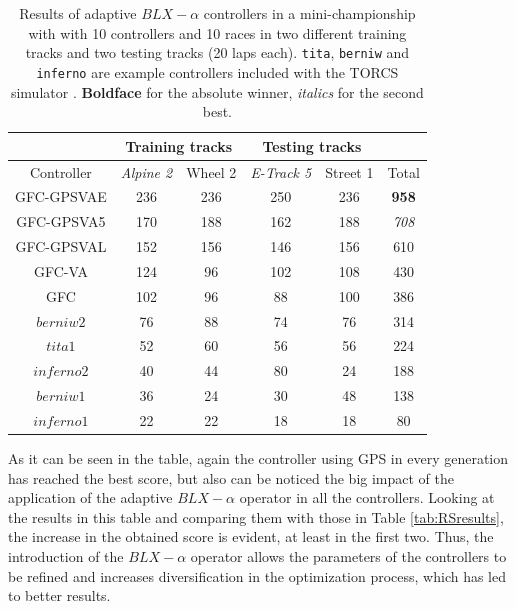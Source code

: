 \documentclass[10pt,journal,compsoc]{IEEEtran}
\begin{document}
%
\begin{table}[ht]
	\centering
	{\scriptsize
          \caption{ Results of adaptive $BLX-\alpha$ controllers in a mini-championship with with 10 controllers
          	and 10 races in two different training tracks and two testing tracks (20 laps each). {\tt tita}, {\tt berniw} and {\tt inferno} are example controllers included with the TORCS simulator \cite{torcs4}. {\bf Boldface} for the absolute winner, {\em italics} for the second best.}
          {
            \begin{tabular}{|c|c|c|c|c||c|}
              \hline
                    & \multicolumn{2}{|c|}{Training tracks} &\multicolumn{2}{|c|}{Testing tracks} \\
              \hline
                    Controller&\textit{Alpine 2} &Wheel 2&\textit{E-Track 5}  &Street 1&Total\\
              \hline
              \hline	
              {\sf GFC-GPSVAE} &236&	236&250&	236&{\bf 958}\\
              {\sf GFC-GPSVA5} \cite{DBLP:conf/cig/SalemMG19}&170&	188&162&	188&	{\em 708}\\

				{\sf GFC-GPSVAL} \cite{DBLP:conf/cig/SalemMG19}&152&	156&146&	156&	610\\

				
				
		{\sf GFC-VA} \cite{DBLP:conf/cig/SalemMG19}&124&	96 &102&	108&	430\\		
		{\sf GFC}  \cite{salem_cig2018}&102&	96 &88 &	100&	386\\
		$berniw2$	 &76 &	88 &74 &	76 &	314\\
		$tita1$	 	&52 &	60 &56 &	56 &	224\\
		$inferno2$ &40 &	44 &80 &	24 &	188\\		
		$berniw1$	 &36 &	24 &30 &	48 &	138\\	
		$inferno1$ &22 &	22 &18 &	18 &	80\\					\hline			
			\end{tabular}
		}\label{tab:VaryingalphaRSresults}
	}
\end{table}
%

As it can be seen in the table, again the controller using GPS in every generation has reached the best score, but also can be noticed the big impact of the application of the adaptive $BLX-\alpha$ operator in all the controllers. Looking at the results in this table and comparing them with those in Table \ref{tab:RSresults}, the increase in the obtained score is evident, at least in the first two.
Thus, the introduction of the $BLX-\alpha$ operator allows the parameters of the controllers to be refined and increases diversification in the optimization process, which has led to better results.
\end{document}
